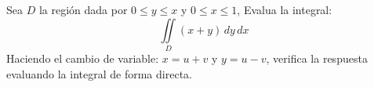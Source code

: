 \noindent Sea $D$ la región dada por $0 \leq y \leq x$ y $0 \leq x \leq 1$, Evalua la integral:
\[\displaystyle\iint\limits_D (x+y) \, dy \, dx\]
\noindent Haciendo el cambio de variable: $x = u+v$ y $y = u-v$, verifica la respuesta evaluando la integral de forma directa.
\vspace{12pt}
